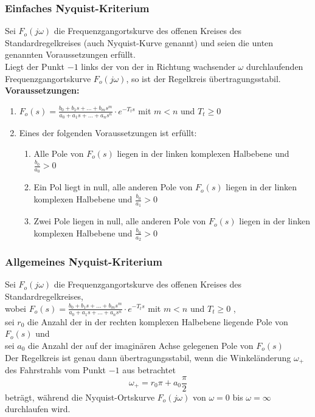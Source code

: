 \documentclass[10pt,a4paper]{article}
\begin{document}
\subsubsection{Einfaches Nyquist-Kriterium}
Sei $F_o(j \omega)$ die Frequenzgangortskurve des offenen Kreises des Standardregelkreises (auch Nyquist-Kurve genannt) und
seien die unten genannten Voraussetzungen erfüllt. \\
Liegt der Punkt $-1$ links der von der in Richtung wachsender $\omega$ durchlaufenden Frequenzgangortskurve $F_o(j \omega)$, so ist der Regelkreis übertragungsstabil. \\

\textbf{Voraussetzungen:}
\begin{enumerate}
	\item $F_o(s) = \frac{b_0 + b_1s + \dots + b_ms^m}{a_0 + a_1s + \dots + a_ns^n} ⋅ e^{-T_ts}$ mit $m < n$ und $T_t ≥ 0$
	\item Eines der folgenden Voraussetzungen ist erfüllt:
	\begin{enumerate}
		\item Alle Pole von $F_o(s)$ liegen in der linken komplexen Halbebene und $\frac{b_0}{a_0} > 0$
		\item Ein Pol liegt in null, alle anderen Pole von $F_o(s)$ liegen in der linken komplexen Halbebene und $\frac{b_0}{a_1} > 0$
		\item Zwei Pole liegen in null, alle anderen Pole von $F_o(s)$ liegen in der linken komplexen Halbebene und $\frac{b_0}{a_2} > 0$
	\end{enumerate}
\end{enumerate}

\subsubsection{Allgemeines Nyquist-Kriterium}
Sei $F_o(j \omega)$ die Frequenzgangortskurve des offenen Kreises des Standardregelkreises, \\
wobei $F_o(s) = \frac{b_0 + b_1s + \dots + b_ms^m}{a_0 + a_1s + \dots + a_ns^n} ⋅ e^{-T_ts}$ mit $m < n$ und $T_t ≥ 0$ ,\\
sei $r_0$ die Anzahl der in der rechten komplexen Halbebene liegende Pole von $F_o(s)$ und \\
sei $a_0$ die Anzahl der auf der imaginären Achse gelegenen Pole von $F_o(s)$ \\

Der Regelkreis ist genau dann übertragungsstabil, wenn die Winkeländerung $\omega_+$ des Fahrstrahls vom Punkt $-1$ aus betrachtet
$$
	\omega_+ = r_0 \pi + a_0 \frac{\pi}{2}
$$
	beträgt, während die Nyquist-Ortskurve $F_o(j \omega)$ von $\omega = 0$ bis $\omega = ∞$ durchlaufen wird.
\end{document}

